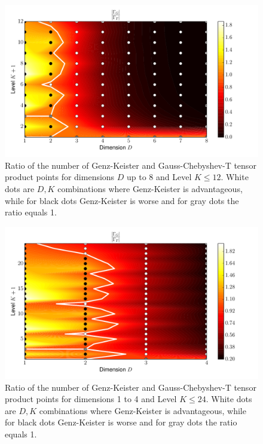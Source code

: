 \documentclass[a4paper,10pt]{article}
\begin{document}
\begin{figure}[h]
  \centering
  \includegraphics[width=0.8\linewidth]{./img/gk_chebyshevt_ratio.pdf}
  \caption{Ratio of the number of Genz-Keister and Gauss-Chebyshev-T tensor product
  points for dimensions $D$ up to 8 and Level $K \leq 12$. White dots are $D,K$
  combinations where Genz-Keister is advantageous, while for black dots
  Genz-Keister is worse and for gray dots the ratio equals 1.}
  \label{fig:gk_chebyshevt_ratio}
\end{figure}

\begin{figure}[h]
  \centering
  \includegraphics[width=0.8\linewidth]{./img/gk_chebyshevt_ratio_large.pdf}
  \caption{Ratio of the number of Genz-Keister and Gauss-Chebyshev-T tensor product
  points for dimensions 1 to 4 and Level $K \leq 24$. White dots are $D,K$
  combinations where Genz-Keister is advantageous, while for black dots
  Genz-Keister is worse and for gray dots the ratio equals 1.}
  \label{fig:gk_chebyshevt_ratio_large}
\end{figure}
\end{document}

